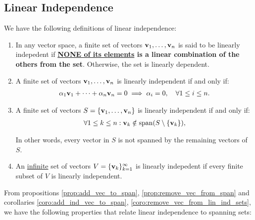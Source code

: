 \subsection{Linear Independence}
\begin{definition}
	We have the following definitions of linear independence:
	\begin{enumerate}	
		\item In any vector space, a finite set of vectors ${\bf v}_1, \dots, {\bf v}_n$ is said to be linearly indepedent if \textup{\textbf{\underline{NONE of its elements} is a linear combination of the others from the set}}. Otherwise, the set is linearly dependent.
		\item A finite set of vectors ${\bf v}_1, \dots, {\bf v}_n$ is linearly independent if and only if:
		\begin{align*}
			\alpha_1{\bf v}_1 + \dots + \alpha_n{\bf v}_n = 0 \implies \alpha_i = 0, \quad \forall 1\le i\le n.	
		\end{align*} 

		\item A finite set of vectors $S=\{{\bf v}_1, \dots, {\bf v}_n\}$ is linearly independent if and only if:
		\begin{align*}
			\forall 1 \le k \le n: {\bf v}_k \notin \mathrm{span}(S\setminus\{{\bf v}_k\}),
		\end{align*} 

		\noindent In other words, every vector in $S$ is not spanned by the remaining vectors of $S$.
	
		\item An \underline{infinite} set of vectors $V=\{{\bf v}_k\}_{k=1}^\infty$ is linearly indepedent if every finite subset of $V$ is linearly independent.
	\end{enumerate} 
\end{definition} 

\begin{definition}
	From propositions \ref{prop:add_vec_to_span}, \ref{prop:remove_vec_from_span} and corollaries \ref{coro:add_ind_vec_to_span}, \ref{coro:remove_vec_from_lin_ind_sets}, we have the following properties that relate linear independence to spanning sets:
\end{definition} 

